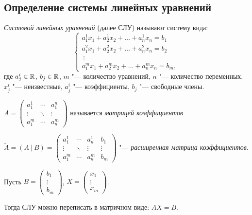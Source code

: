 \subsection*{Определение системы линейных уравнений}
\begin{definition}
    \textit{Системой линейных уравнений} (далее СЛУ) называют систему вида:
    \begin{equation}
        \label{eq:SLU}
        \begin{cases}
        a_1^1x_1 +  a_2^1x_2 + \ldots + a_n^1x_n = b_1 \\
        a_1^2x_1 +  a_2^2x_2 + \ldots + a_n^2x_n = b_2 \\
        ~\vdots \\
        a_1^mx_1 +  a_2^mx_2 + \dots + a_n^mx_n = b_m,
    \end{cases}
    \end{equation} 
    где $a_j^i \in \mathbb{R}$, $b_j \in \mathbb{R}$, $m$ "--- количество уравнений, $n$ "--- количество переменных, $x_j^i$ "--- неизвестные, $a_j^i$ "--- коэффициенты, $b_j$ "--- свободные члены.
\end{definition}
$A = \begin{pmatrix}
    a_1^1 & \cdots & a_1^n \\
    \vdots & \ddots & \vdots \\
    a_1^m & \cdots & a_n^m
\end{pmatrix}$ называется \textit{матрицей коэффициентов}

$\tilde{A} = (A~|~B) =
\left({ 
\begin{array}{ccc|c}
    a_1^1 & \cdots & a_n^1 & b_1 \\
    \vdots & \ddots & \vdots & \vdots \\
    a_1^m & \cdots & a_n^m & b_m
\end{array}} \right)$ "--- \textit{расширенная матрица коэффициентов}.

Пусть $B = \begin{pmatrix}
    b_1 \\
    \vdots \\
    b_m
\end{pmatrix}$, $X = \begin{pmatrix}
    x_1 \\
    \vdots \\
    x_m
\end{pmatrix}$. 

Тогда СЛУ можно переписать в матричном виде:
$ AX = B$.

\vspace{0.2cm}

